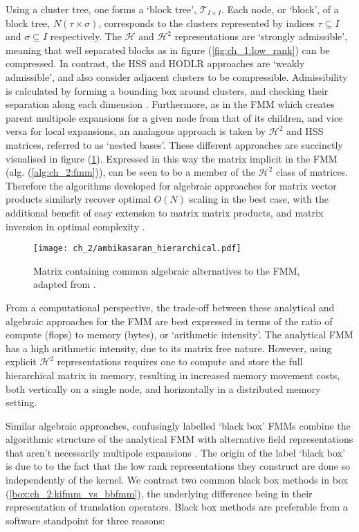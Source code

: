 Using a cluster tree, one forms a `block tree', $\mathcal{T}_{I \times I}$. Each node, or `block', of a block tree, $N(\tau \times \sigma)$, corresponds to the clusters represented by indices $\tau \subseteq I$ and $\sigma \subseteq I$ respectively. The $\mathcal{H}$ and $\mathcal{H}^2$ representations are `strongly admissible', meaning that well separated blocks as in figure (\ref{fig:ch_1:low_rank}) can be compressed. In contrast, the HSS and HODLR approaches are `weakly admissible', and also consider adjacent clusters to be compressible. Admissibility is calculated by forming a bounding box around clusters, and checking their separation along each dimension \cite{borm2003introduction}. Furthermore, as in the FMM which creates parent multipole expansions for a given node from that of its children, and vice versa for local expansions, an analagous approach is taken by $\mathcal{H}^2$ and HSS matrices, referred to as `nested bases'. These different approaches are succinctly visualised in figure (\ref{fig:ch_2:ambikasaran_hierarchical}).  Expressed in this way the matrix implicit in the FMM (alg. (\ref{alg:ch_2:fmm})), can be seen to be a member of the $\mathcal{H}^2$ class of matrices. Therefore the algorithms developed for algebraic approaches for matrix vector products similarly recover optimal $O(N)$ scaling in the best case, with the additional benefit of easy extension to matrix matrix products, and matrix inversion in optimal complexity \cite{borm2003introduction}.

\begin{figure}
    \centering
    \texttt{[image: ch\_2/ambikasaran\_hierarchical.pdf]}
    \caption{Matrix containing common algebraic alternatives to the FMM, adapted from \cite{ambikasaran2013fast}.}
    \label{fig:ch_2:ambikasaran_hierarchical}
\end{figure}

From a computational perspective, the trade-off between these analytical and algebraic approaches for the FMM are best expressed in terms of the ratio of compute (flops) to memory (bytes), or `arithmetic intensity'. The analytical FMM has a high arithmetic intensity, due to its matrix free nature. However, using explicit $\mathcal{H}^2$ representations requires one to compute and store the full hierarchical matrix in memory, resulting in increased memory movement costs, both vertically on a single node, and horizontally in a distributed memory setting. 

Similar algebraic approaches, confusingly labelled `black box' FMMs combine the algorithmic structure of the analytical FMM with alternative field representations that aren't necessarily multipole expansions \cite{Ying:2004:JCP,fong2009black,martinsson2007accelerated}. The origin of the label `black box' is due to to the fact that the low rank representations they construct are done so independently of the kernel. We contrast two common black box methods in box (\ref{box:ch_2:kifmm_vs_bbfmm}), the underlying difference being in their representation of translation operators. Black box methods are preferable from a software standpoint for three reasons:

